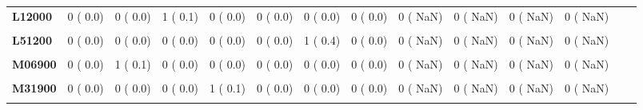 \documentclass[
]{article}
\begin{document}
\begin{table}[H]
\begin{tabular}[t]{>{\raggedright\arraybackslash}p{5em}ccccccccccccc}
\textbf{L12000} & 0 (  0.0) & 0 (  0.0) & 1 (  0.1) & 0 (  0.0) & 0 (  0.0) & 0 (  0.0) & 0 (  0.0) & 0 (  NaN) & 0 (  NaN) & 0 (  NaN) & 0 (  NaN) &  & \\
\textbf{\cellcolor{gray!10}{L12800}} & \cellcolor{gray!10}{0 (  0.0)} & \cellcolor{gray!10}{0 (  0.0)} & \cellcolor{gray!10}{0 (  0.0)} & \cellcolor{gray!10}{1 (  0.1)} & \cellcolor{gray!10}{0 (  0.0)} & \cellcolor{gray!10}{0 (  0.0)} & \cellcolor{gray!10}{0 (  0.0)} & \cellcolor{gray!10}{0 (  NaN)} & \cellcolor{gray!10}{0 (  NaN)} & \cellcolor{gray!10}{0 (  NaN)} & \cellcolor{gray!10}{0 (  NaN)} & \cellcolor{gray!10}{} & \cellcolor{gray!10}{}\\
\textbf{L51200} & 0 (  0.0) & 0 (  0.0) & 0 (  0.0) & 0 (  0.0) & 0 (  0.0) & 1 (  0.4) & 0 (  0.0) & 0 (  NaN) & 0 (  NaN) & 0 (  NaN) & 0 (  NaN) &  & \\
\textbf{\cellcolor{gray!10}{L89000}} & \cellcolor{gray!10}{6 (  0.7)} & \cellcolor{gray!10}{4 (  0.4)} & \cellcolor{gray!10}{3 (  0.3)} & \cellcolor{gray!10}{5 (  0.7)} & \cellcolor{gray!10}{3 (  0.7)} & \cellcolor{gray!10}{1 (  0.4)} & \cellcolor{gray!10}{1 (  0.4)} & \cellcolor{gray!10}{0 (  NaN)} & \cellcolor{gray!10}{0 (  NaN)} & \cellcolor{gray!10}{0 (  NaN)} & \cellcolor{gray!10}{0 (  NaN)} & \cellcolor{gray!10}{} & \cellcolor{gray!10}{}\\
\textbf{M06900} & 0 (  0.0) & 1 (  0.1) & 0 (  0.0) & 0 (  0.0) & 0 (  0.0) & 0 (  0.0) & 0 (  0.0) & 0 (  NaN) & 0 (  NaN) & 0 (  NaN) & 0 (  NaN) &  & \\
\textbf{\cellcolor{gray!10}{M25900}} & \cellcolor{gray!10}{0 (  0.0)} & \cellcolor{gray!10}{0 (  0.0)} & \cellcolor{gray!10}{1 (  0.1)} & \cellcolor{gray!10}{0 (  0.0)} & \cellcolor{gray!10}{0 (  0.0)} & \cellcolor{gray!10}{0 (  0.0)} & \cellcolor{gray!10}{0 (  0.0)} & \cellcolor{gray!10}{0 (  NaN)} & \cellcolor{gray!10}{0 (  NaN)} & \cellcolor{gray!10}{0 (  NaN)} & \cellcolor{gray!10}{0 (  NaN)} & \cellcolor{gray!10}{} & \cellcolor{gray!10}{}\\
\textbf{M31900} & 0 (  0.0) & 0 (  0.0) & 0 (  0.0) & 1 (  0.1) & 0 (  0.0) & 0 (  0.0) & 0 (  0.0) & 0 (  NaN) & 0 (  NaN) & 0 (  NaN) & 0 (  NaN) &  & \\
\textbf{\cellcolor{gray!10}{M33200}} & \cellcolor{gray!10}{0 (  0.0)} & \cellcolor{gray!10}{0 (  0.0)} & \cellcolor{gray!10}{1 (  0.1)} & \cellcolor{gray!10}{0 (  0.0)} & \cellcolor{gray!10}{0 (  0.0)} & \cellcolor{gray!10}{0 (  0.0)} & \cellcolor{gray!10}{0 (  0.0)} & \cellcolor{gray!10}{0 (  NaN)} & \cellcolor{gray!10}{0 (  NaN)} & \cellcolor{gray!10}{0 (  NaN)} & \cellcolor{gray!10}{0 (  NaN)} & \cellcolor{gray!10}{} & \cellcolor{gray!10}{}\\

\end{tabular}
\end{table}
\end{document}
